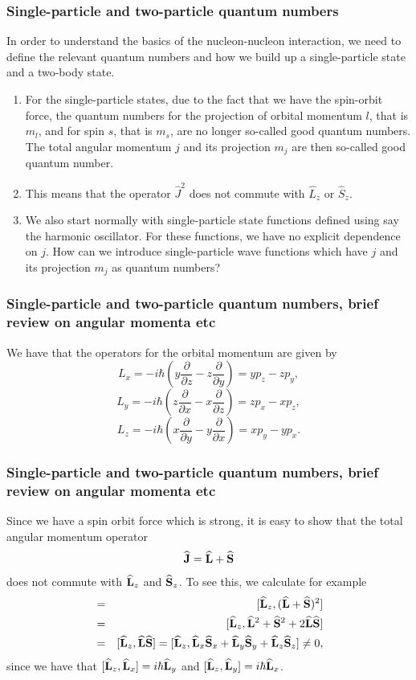 \documentclass[compress]{beamer}
\newcommand{\OP}[1]{{\bf\widehat{#1}}}
\begin{document}
\frame
{
\frametitle{Single-particle and two-particle quantum numbers}

\begin{small}
{\scriptsize
In order to understand the basics of the nucleon-nucleon interaction, we need to define the relevant quantum numbers and how we build up a single-particle state and a two-body state. 
\begin{enumerate}
\item For the single-particle states, due to the fact that we have the spin-orbit force, the quantum numbers for the projection of orbital momentum $l$, that is $m_l$, and for spin $s$, that is $m_s$, are no longer so-called good quantum numbers. The total angular momentum $j$ and its projection $m_j$ are then 
so-called good quantum number.
\item This means that the operator $\hat{J}^2$ does not commute with $\hat{L}_z$  or $\hat{S}_z$.  
\item We also start normally with single-particle state functions defined using say the harmonic oscillator. For these functions, we have no explicit dependence on $j$. How can we introduce single-particle wave functions which have $j$ and its projection $m_j$ as quantum numbers? 
\end{enumerate}
}
\end{small}
}


\frame
{
\frametitle{Single-particle and two-particle quantum numbers, brief review on angular momenta etc}

\begin{small}
{\scriptsize
We have that the operators for the orbital momentum are given by
\[
L_x=-i\hbar(y\frac{\partial }{\partial z}-z\frac{\partial }{\partial y})=
yp_z-zp_y,
\]
\[
L_y=-i\hbar(z\frac{\partial }{\partial x}-x\frac{\partial }{\partial z})= zp_x-xp_z,
\]
\[
L_z=-i\hbar(x\frac{\partial }{\partial y}-y\frac{\partial }{\partial x})=xp_y-yp_x.
\]
}
\end{small}
}


\frame
{
\frametitle{Single-particle and two-particle quantum numbers, brief review on angular momenta etc}

\begin{small}
{\scriptsize
Since we have a spin orbit force which is strong, it is easy to show that 
the total angular momentum operator
\[
   \OP{J}=\OP{L}+\OP{S}
\]
does not commute with $\OP{L}_z$ and $\OP{S}_z$. To see this, we calculate for example
\begin{eqnarray} 
   [\OP{L}_z,\OP{J}^2]&=&[\OP{L}_z,(\OP{L}+\OP{S})^2] \\ \nonumber
   &=&[\OP{L}_z,\OP{L}^2+\OP{S}^2+2\OP{L}\OP{S}]\\ \nonumber 
   &=& [\OP{L}_z,\OP{L}\OP{S}]=[\OP{L}_z,\OP{L}_x\OP{S}_x+\OP{L}_y\OP{S}_y+\OP{L}_z\OP{S}_z]\ne 0, 
\end{eqnarray}
since we have that $[\OP{L}_z,\OP{L}_x]=i\hbar\OP{L}_y$ and $[\OP{L}_z,\OP{L}_y]=i\hbar\OP{L}_x$. 
}
\end{small}
}
\end{document}
